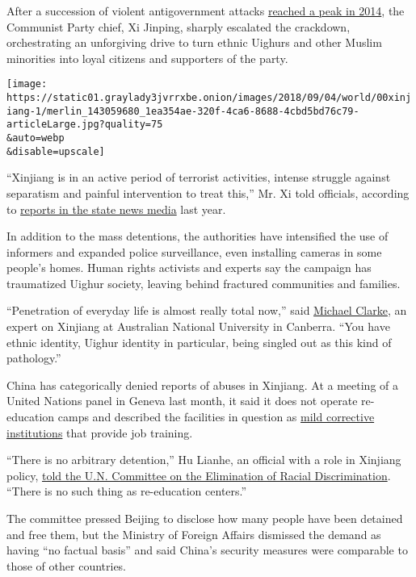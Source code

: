 After a succession of violent antigovernment attacks
\href{https://www.nytimes3xbfgragh.onion/2014/03/04/world/asia/han-uighur-relations-china.html}{reached
a peak in 2014}, the Communist Party chief, Xi Jinping, sharply
escalated the crackdown, orchestrating an unforgiving drive to turn
ethnic Uighurs and other Muslim minorities into loyal citizens and
supporters of the party.

\texttt{[image: https://static01.graylady3jvrrxbe.onion/images/2018/09/04/world/00xinjiang-1/merlin\_143059680\_1ea354ae-320f-4ca6-8688-4cbd5bd76c79-articleLarge.jpg?quality=75\\\&auto=webp\\\&disable=upscale]}

``Xinjiang is in an active period of terrorist activities, intense
struggle against separatism and painful intervention to treat this,''
Mr. Xi told officials, according to
\href{http://cpc.people.com.cn/n1/2017/0420/c64102-29225251.html}{reports
in the state news media} last year.

In addition to the mass detentions, the authorities have intensified the
use of informers and expanded police surveillance, even installing
cameras in some people's homes. Human rights activists and experts say
the campaign has traumatized Uighur society, leaving behind fractured
communities and families.

``Penetration of everyday life is almost really total now,'' said
\href{https://crawford.anu.edu.au/people/academic/michael-clarke}{Michael
Clarke}, an expert on Xinjiang at Australian National University in
Canberra. ``You have ethnic identity, Uighur identity in particular,
being singled out as this kind of pathology.''

China has categorically denied reports of abuses in Xinjiang. At a
meeting of a United Nations panel in Geneva last month, it said it does
not operate re-education camps and described the facilities in question
as
\href{https://www.nytimes3xbfgragh.onion/2018/08/13/world/asia/china-xinjiang-un.html}{mild
corrective institutions} that provide job training.

``There is no arbitrary detention,'' Hu Lianhe, an official with a role
in Xinjiang policy,
\href{http://webtv.un.org/en/ga/watch/consideration-of-china-contd-2655th-meeting-96th-session-committee-on-elimination-of-racial-discrimination/5821422267001/?term=\&lan=english}{told
the U.N. Committee on the Elimination of Racial Discrimination}. ``There
is no such thing as re-education centers.''

The committee pressed Beijing to disclose how many people have been
detained and free them, but the Ministry of Foreign Affairs dismissed
the demand as having ``no factual basis'' and said China's security
measures were comparable to those of other countries.


